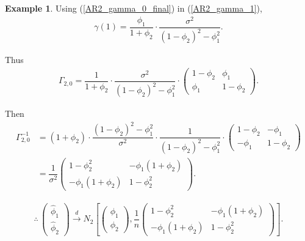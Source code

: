 \documentclass[11pt, a4paper]{article}
\numberwithin{equation}{section}
\theoremstyle{definition}
\newtheorem{example}{Example}[subsection]
\begin{document}
\begin{example}
Using (\ref{AR2_gamma_0_final}) in (\ref{AR2_gamma_1}), 
\begin{align}
\gamma(1) = \dfrac{\phi_1}{1 + \phi_2} \cdot \dfrac{\sigma^2}{\left( 1 - \phi_2 \right)^2 - \phi_1^2}.
\end{align}

Thus
\begin{gather}
\Gamma_{2, 0} = \dfrac{1}{1 + \phi_2} \cdot \dfrac{\sigma^2}{\left( 1 - \phi_2 \right)^2 - \phi_1^2} \cdot \begin{pmatrix}
1 - \phi_2 & \phi_1 \\ \phi_1 & 1 - \phi_2
\end{pmatrix}.
\end{gather}

Then
\begin{align*}
\Gamma_{2, 0}^{-1} &= \left( 1 + \phi_2 \right) \cdot \dfrac{\left( 1 - \phi_2 \right)^2 - \phi_1^2}{\sigma^2} \cdot \dfrac{1}{\left( 1 - \phi_2 \right)^2 - \phi_1^2} \cdot \begin{pmatrix}
1 - \phi_2 & -\phi_1 \\ -\phi_1 & 1 - \phi_2
\end{pmatrix} \\[1em]
&= \dfrac{1}{\sigma^2} \begin{pmatrix}
1 - \phi_2^2 & -\phi_1 \left( 1 + \phi_2 \right) \\[0.3em] -\phi_1 \left( 1 + \phi_2 \right) & 1 - \phi_2^2
\end{pmatrix}.
\end{align*}

\vspace{0.5cm}

\begin{align}\label{AR2_large_sample_distribution}
\therefore \, \begin{pmatrix} \hat{\phi}_1 \\[0.3em] \hat{\phi}_2 \end{pmatrix} \overset{d}{\rightarrow} N_2 \left[ \begin{pmatrix} \phi_1 \\[0.3em] \phi_2 \end{pmatrix},  \dfrac{1}{n} \begin{pmatrix}
1 - \phi_2^2 & -\phi_1 \left( 1 + \phi_2 \right) \\[0.3em] -\phi_1 \left( 1 + \phi_2 \right) & 1 - \phi_2^2 \end{pmatrix} \right].
\end{align}
\end{example}
\end{document}
